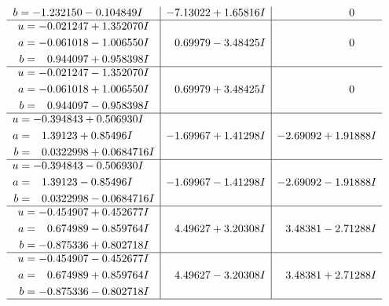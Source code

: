 \documentclass[1p]{elsarticle_modified}
\theoremstyle{definition}
\begin{document}
$$\begin{array}{c|c|c}
\begin{aligned}
b &= -1.232150 - 0.104849 I\end{aligned}
 & -7.13022 + 1.65816 I & \phantom{-0.000000 } 0 \\ \hline\begin{aligned}
u &= -0.021247 + 1.352070 I \\
a &= -0.061018 - 1.006550 I \\
b &= \phantom{-}0.944097 + 0.958398 I\end{aligned}
 & \phantom{-}0.69979 - 3.48425 I & \phantom{-0.000000 } 0 \\ \hline\begin{aligned}
u &= -0.021247 - 1.352070 I \\
a &= -0.061018 + 1.006550 I \\
b &= \phantom{-}0.944097 - 0.958398 I\end{aligned}
 & \phantom{-}0.69979 + 3.48425 I & \phantom{-0.000000 } 0 \\ \hline\begin{aligned}
u &= -0.394843 + 0.506930 I \\
a &= \phantom{-}1.39123 + 0.85496 I \\
b &= \phantom{-}0.0322998 + 0.0684716 I\end{aligned}
 & -1.69967 + 1.41298 I & -2.69092 + 1.91888 I \\ \hline\begin{aligned}
u &= -0.394843 - 0.506930 I \\
a &= \phantom{-}1.39123 - 0.85496 I \\
b &= \phantom{-}0.0322998 - 0.0684716 I\end{aligned}
 & -1.69967 - 1.41298 I & -2.69092 - 1.91888 I \\ \hline\begin{aligned}
u &= -0.454907 + 0.452677 I \\
a &= \phantom{-}0.674989 - 0.859764 I \\
b &= -0.875336 + 0.802718 I\end{aligned}
 & \phantom{-}4.49627 + 3.20308 I & \phantom{-}3.48381 - 2.71288 I \\ \hline\begin{aligned}
u &= -0.454907 - 0.452677 I \\
a &= \phantom{-}0.674989 + 0.859764 I \\
b &= -0.875336 - 0.802718 I\end{aligned}
 & \phantom{-}4.49627 - 3.20308 I & \phantom{-}3.48381 + 2.71288 I\\
 \hline 
 \end{array}$$\newpage$$\begin{array}{c|c|c}  

\end{array}$$
\end{document}
